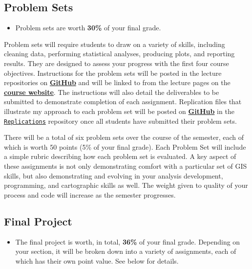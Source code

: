 \documentclass[]{book}
\newenvironment{rmdblock}[1]
  {\begin{shaded*}
  \begin{itemize}
  \renewcommand{\labelitemi}{
    \raisebox{-.7\height}[0pt][0pt]{
      {\setkeys{Gin}{width=3em,keepaspectratio}\texttt{[image: images/\#1]}}
    }
  }
  \item
  }
  {
  \end{itemize}
  \end{shaded*}
  }
\newenvironment{rmdtip}
  {\begin{rmdblock}{tip}}
  {\end{rmdblock}}
\begin{document}
\hypertarget{problem-sets}{%
\subsection{Problem Sets}\label{problem-sets}}

\begin{rmdtip}
Problem sets are worth \textbf{30\%} of your final grade.
\end{rmdtip}

Problem sets will require students to draw on a variety of skills, including cleaning data, performing statistical analyses, producing plots, and reporting results. They are designed to assess your progress with the first four course objectives. Instructions for the problem sets will be posted in the lecture repositories on \href{https://github.com/slu-soc5650}{\textbf{GitHub}} and will be linked to from the lecture pages on the \href{https://slu-soc5650.github.io/}{\textbf{course website}}. The instructions will also detail the deliverables to be submitted to demonstrate completion of each assignment. Replication files that illustrate my approach to each problem set will be posted on \href{https://github.com/slu-soc5650}{\textbf{GitHub}} in the \href{https://github.com/slu-soc5650/Replications}{\texttt{Replications}} repository once all students have submitted their problem sets.

There will be a total of six problem sets over the course of the semester, each of which is worth 50 points (5\% of your final grade). Each Problem Set will include a simple rubric describing how each problem set is evaluated. A key aspect of these assignments is not only demonstrating comfort with a particular set of GIS skills, but also demonstrating and evolving in your analysis development, programming, and cartographic skills as well. The weight given to quality of your process and code will increase as the semester progresses.

\hypertarget{final-project}{%
\subsection{Final Project}\label{final-project}}

\begin{rmdtip}
The final project is worth, in total, \textbf{36\%} of your final grade.
Depending on your section, it will be broken down into a variety of
assignments, each of which has their own point value. See below for
details.
\end{rmdtip}
\end{document}
